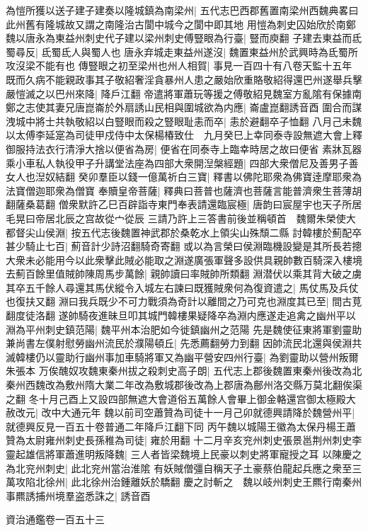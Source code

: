 為愷所獲以送子建子建奏以隆城鎮為南梁州|{
	五代志巴西郡舊置南梁州西魏典畧曰此州舊有隆城故又謂之南隆治古閬中城今之閬中即其地}
用愷為刺史囚始欣於南鄭魏以唐永為東益州刺史代子建以梁州刺史傅豎眼為行臺|{
	豎而庾翻}
子建去東益而氐蜀尋反|{
	氐蜀氐人與蜀人也}
唐永弃城走東益州遂沒|{
	魏置東益州於武興時為氐蜀所攻沒梁不能有也}
傳豎眼之初至梁州也州人相賀|{
	事見一百四十有八卷天監十五年}
既而久病不能親政事其子敬紹奢淫貪暴州人患之嚴始欣重賂敬紹得還巴州遂舉兵擊嚴愷滅之以巴州來降|{
	降戶江翻}
帝遣將軍蕭玩等援之傅敬紹見魏室方亂隂有保據南鄭之志使其妻兄唐崑崙於外扇誘山民相與圍城欲為内應|{
	崙盧崑翻誘音酉}
圍合而謀洩城中將士共執敬紹以白豎眼而殺之豎眼耻恚而卒|{
	恚於避翻卒子恤翻}
八月己未魏以太傅李延寔為司徒甲戍侍中太保楊椿致仕　九月癸巳上幸同泰寺設無遮大會上釋御服持法衣行清淨大捨以便省為房|{
	便省在同泰寺上臨幸時居之故曰便省}
素牀瓦器乘小車私人執役甲子升講堂法座為四部大衆開湼槃經題|{
	四部大衆僧尼及善男子善女人也湼奴結翻}
癸卯羣臣以錢一億萬祈白三寶|{
	釋書以佛陀耶衆為佛寶逹摩耶衆為法寶僧迦耶衆為僧寶}
奉贖皇帝菩薩|{
	釋典曰菩普也薩濟也菩薩言能普濟衆生菩薄胡翻薩桑葛翻}
僧衆默許乙巳百辟詣寺東門奉表請還臨宸極|{
	唐韵曰宸屋宇也天子所居毛晃曰帝居北辰之宫故從宀從辰}
三請乃許上三答書前後並稱頓首　魏爾朱榮使大都督尖山侯淵|{
	按五代志後魏置神武郡於桑乾水上領尖山殊頹二縣}
討韓樓於薊配卒甚少騎止七百|{
	薊音計少詩沼翻騎奇寄翻}
或以為言榮曰侯淵臨機設變是其所長若摠大衆未必能用今以此衆擊此賊必能取之淵遂廣張軍聲多設供具親帥數百騎深入樓境去薊百餘里值賊帥陳周馬步萬餘|{
	親帥讀曰率賊帥所類翻}
淵潜伏以乘其背大破之虜其卒五千餘人尋還其馬伏縱令入城左右諫曰既獲賊衆何為復資遣之|{
	馬仗馬及兵仗也復扶又翻}
淵曰我兵既少不可力戰須為奇計以離間之乃可克也淵度其已至|{
	間古莧翻度徒洛翻}
遂帥騎夜進昧旦叩其城門韓樓果疑降卒為淵内應遂走追禽之幽州平以淵為平州刺史鎮范陽|{
	魏平州本治肥如今徙鎮幽州之范陽}
先是魏使征東將軍劉靈助兼尚書左僕射慰勞幽州流民於濮陽頓丘|{
	先悉薦翻勞力到翻}
因帥流民北還與侯淵共滅韓樓仍以靈助行幽州事加車騎將軍又為幽平營安四州行臺|{
	為劉靈助以營州叛爾朱張本}
万俟醜奴攻魏東秦州拔之殺刺史高子朗|{
	五代志上郡後魏置東秦州後改為北秦州西魏改為敷州隋大業二年改為敷城郡後改為上郡唐為鄜州洛交縣万莫北翻俟渠之翻}
冬十月己酉上又設四部無遮大會道俗五萬餘人會畢上御金輅還宫御太極殿大赦改元|{
	改中大通元年}
魏以前司空蕭贊為司徒十一月己卯就德興請降於魏營州平|{
	就德興反見一百五十卷普通二年降戶江翻下同}
丙午魏以城陽王徽為太保丹楊王蕭贊為太尉雍州刺史長孫稚為司徒|{
	雍於用翻}
十二月辛亥兖州刺史張景邕荆州刺史李靈起雄信將軍蕭進明叛降魏|{
	三人者皆梁魏境上民豪以刺史將軍寵授之耳}
以陳慶之為北兖州刺史|{
	此北兖州當治淮隂}
有妖賊僧彊自稱天子土豪蔡伯龍起兵應之衆至三萬攻陷北徐州|{
	此北徐州治鍾離妖於驕翻}
慶之討斬之　魏以岐州刺史王羆行南秦州事羆誘捕州境羣盗悉誅之|{
	誘音酉}


資治通鑑卷一百五十三

